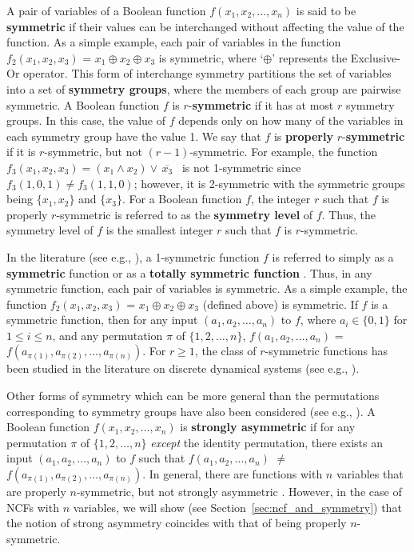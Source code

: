 A pair of variables of a Boolean function $f(x_1, x_2, \ldots, x_n)$ is
said to be \textbf{symmetric} if their values can be interchanged without
affecting the value of the function.
As a simple example, each pair of variables in the function 
$f_2(x_1, x_2, x_3)$ = $x_1 \oplus x_2 \oplus x_3$ is symmetric,
where `$\oplus$' represents the Exclusive-Or operator.
This form of interchange symmetry partitions the set of variables into a set of
\textbf{symmetry groups}, where the members of each group are pairwise symmetric.
A Boolean function $f$ is 
$r$-\textbf{symmetric} if it has at most $r$ symmetry groups.
In this case, the value of $f$
depends only on how many of the variables in each symmetry group have the value 1.
We say that $f$ is \textbf{properly} $r$-\textbf{symmetric} if
it is $r$-symmetric, but not $(r-1)$-symmetric.
For example, the function $f_3(x_1, x_2, x_3) = (x_1 \wedge x_2) \vee\, \overline{x_3}$~
is not 1-symmetric since $f_3(1, 0, 1) \neq f_3(1, 1, 0)$; however, 
it is 2-symmetric with the symmetric groups being $\{x_1, x_2\}$ and $\{x_3\}$.
For a Boolean function $f$, the integer $r$ such that $f$ is properly $r$-symmetric
is referred to as the \textbf{symmetry level} of $f$.
Thus, the symmetry level of $f$ is the smallest integer $r$ such that
$f$ is $r$-symmetric.

In the literature (see e.g., \cite{Crama-Hammer-2011,HT-2016,Toth-etal-1977}),
a 1-symmetric function $f$ is referred to simply
as a \textbf{symmetric} function or 
as a \textbf{totally symmetric function} \citep{Biswas-1970,BS-1968}.
Thus, in any symmetric function, each pair of variables is symmetric.
As a simple example, the function $f_2(x_1, x_2, x_3)$ = 
$x_1 \oplus x_2 \oplus x_3$ (defined above) is symmetric.
If $f$ is a symmetric function, then for any
input $(a_1, a_2, \ldots, a_n)$ to $f$, where $a_i \in \{0,1\}$ for
$1 \leq i \leq n$, and any permutation $\pi$ of $\{1, 2, \ldots, n\}$,
$f(a_1, a_2, \ldots, a_n)$ = $f(a_{\pi(1)}, a_{\pi(2)}, \ldots, a_{\pi(n)})$.
For $r \geq 1$, the class of $r$-symmetric functions has been
studied in the literature on discrete dynamical systems (see e.g., 
\cite{Barrett-etal-2007,Rosenkrantz-etal-2015,MR-2007}).

Other forms of symmetry which can be more general than the permutations 
corresponding to symmetry groups have also been considered (see e.g.,
\cite{Maurer-2015,KS-2000}).
A Boolean function $f(x_1, x_2, \ldots, x_n)$
is \textbf{strongly asymmetric}
if for any permutation $\pi$ of $\{1, 2, \ldots, n\}$
\emph{except} the identity permutation,
there exists an input $(a_1, a_2, \ldots,  a_n)$
to $f$ such that $f(a_1, a_2, \ldots, a_n)$ $\neq$
$f(a_{\pi(1)}, a_{\pi(2)}, \ldots, a_{\pi(n)})$.
In general, there are functions with $n$ variables that are properly
$n$-symmetric, but not strongly asymmetric \citep{KS-2000}.
However, in the case of NCFs with $n$ variables, we will show 
(see Section~\ref{sec:ncf_and_symmetry}) that the notion of 
strong asymmetry coincides with that 
of being properly $n$-symmetric.

